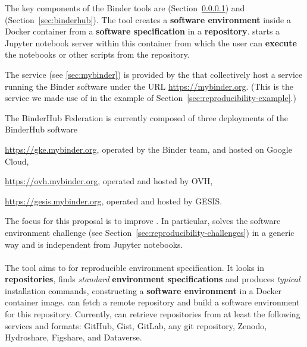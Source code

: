 The key components of the Binder tools are \repotodocker{}
(Section~\ref{sec:repo2docker}) and \binderhub{} (Section~\ref{sec:binderhub}). The \repotodocker{} tool
creates a \textbf{software environment} inside a Docker container from a \textbf{software
specification} in a \textbf{repository}. \binderhub{} starts a Jupyter notebook server
within this container from which the user can \textbf{execute} the notebooks or other scripts from the
repository.

The \emph{\mybinder{}} service (see \ref{sec:mybinder}) is provided by the  that collectively host a service running the Binder software
under the URL \url{https://mybinder.org}. (This is the service we made use of in the example
of Section~\ref{sec:reproducibility-example}.)

The BinderHub Federation is currently composed of three deployments of the BinderHub software

\begin{compactitem}
\item \url{https://gke.mybinder.org}, operated by the Binder team, and hosted on Google Cloud,
\item \url{https://ovh.mybinder.org}, operated and hosted by OVH,
\item \url{https://gesis.mybinder.org}, operated and hosted by GESIS.
\end{compactitem}

The focus for this proposal is to improve \repotodocker{}. In particular,
\repotodocker{} solves the software environment challenge (see
Section~\ref{sec:reproducibility-challenges}) in a generic way and is independent
from Jupyter notebooks.


\paragraph{\repotodocker}\label{sec:repo2docker}
The \repotodocker{} tool aims to  for reproducible environment specification.
It looks in \textbf{repositories}, finds \emph{standard} \textbf{environment specifications} and produces \emph{typical} installation commands,
constructing a \textbf{software environment} in a Docker container image.
\repotodocker{} can fetch a remote repository and build a software
environment for this repository. Currently, \repotodocker{} can retrieve
repositories from at least the following services and formats: GitHub, Gist, GitLab, any git repository,
Zenodo, Hydroshare, Figshare, and Dataverse.

